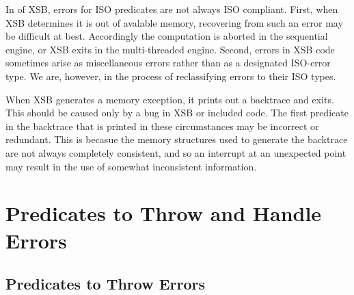 In \version{} of XSB, errors for ISO predicates are not always ISO
compliant.  First, when XSB determines it is out of avalable memory,
recovering from such an error may be difficult at best.  Accordingly
the computation is aborted in the sequential engine, or XSB exits in
the multi-threaded engine.  Second, errors in XSB code sometimes arise
as miscellaneous errors rather than as a designated ISO-error type.
We are, however, in the process of reclassifying errors to their ISO
types.

When XSB generates a memory exception, it prints out a backtrace and
exits.  This should be caused only by a bug in XSB or included code.
The first predicate in the backtrace that is printed in these
circumstances may be incorrect or redundant.  This is becasue the
memory structures used to generate the backtrace are not always
completely consistent, and so an interrupt at an unexpected point may
result in the use of somewhat inconsistent information.

\section{Predicates to Throw and Handle Errors}
\label{sec:errorpredicates}

\subsection{Predicates to Throw Errors}

